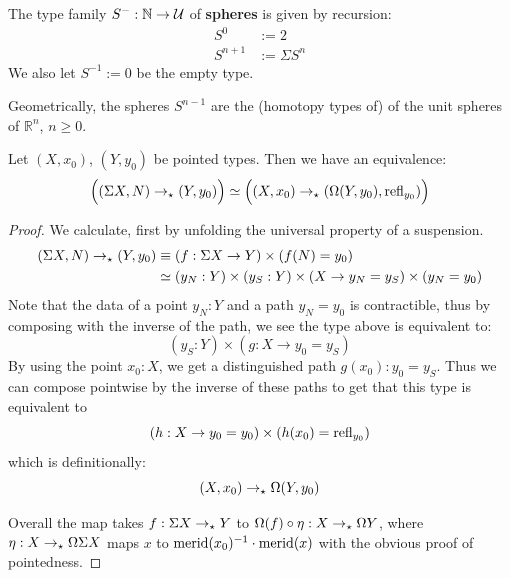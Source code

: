 \documentclass[10pt,oneside,leqno,openright]{memoir}
\begin{document}
\begin{definition} The type family $S^{-} : \mathbb{N} \to \mathcal{U}$ of \textbf{spheres} is given by recursion:
    \begin{align*}
        S^0 &:= 2 \\
        S^{n+1} &:= \Sigma S^n
    \end{align*}
    We also let $S^{-1} := 0$ be the empty type.
\end{definition}
Geometrically, the spheres $S^{n-1}$ are the (homotopy types of) of the unit spheres of $\mathbb{R}^n$, $n\ge0$.
\begin{theorem}
    Let $(X, x_0)$, $(Y, y_0)$ be pointed types. Then we have an equivalence:
    \[ \Bigl((\Sigma X, N) \to_\star (Y, y_0)\Bigr) \simeq \Bigl((X,x_0) \to_\star (\Omega(Y, y_0), \mathrm{refl}_{y_0})\Bigr) \]
\end{theorem}
\begin{proof}
    We calculate, first by unfolding the universal property of a suspension.
    \begin{align*}
        (\Sigma X, N) \to_\star (Y, y_0)
        &\equiv (f : \Sigma X \to Y) \times (f(N) = y_0) \\
        &\simeq (y_N : Y) \times (y_S : Y) \times (X \to y_N = y_S) \times (y_N = y_0)
    \end{align*}
    Note that the data of a point $y_N : Y$ and a path $y_N = y_0$ is contractible, thus by composing with the inverse of the path, we see the type above is equivalent to:
    \[ (y_S : Y) \times (g : X \to y_0 = y_S) \]
    By using the point $x_0 : X$, we get a distinguished path $g(x_0) : y_0 = y_S$.
    Thus we can compose pointwise by the inverse of these paths to get that this type is equivalent to
    \[ (h : X \to y_0 = y_0) \times (h(x_0) = \mathrm{refl}_{y_0}) \]
    which is definitionally:
    \[ (X, x_0) \to_\star \Omega(Y, y_0)\]

    Overall the map takes $f : \Sigma X \to_\star Y$ to
    $\Omega(f) \circ \eta : X \to_\star \Omega Y$,
    where $\eta : X \to_\star \Omega\Sigma X$ maps $x$ to $\operatorname{merid}(x_0)^{-1}\cdot \operatorname{merid}(x)$
    with the obvious proof of pointedness.
\end{proof}
\end{document}
